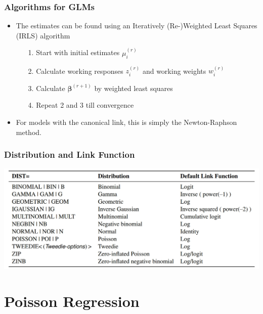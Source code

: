 \documentclass[10pt,xcolor={svgnames},t]{beamer}
\begin{document}
\begin{frame}
	\frametitle{Algorithms for GLMs}
	
	\begin{itemize}
		\item The estimates can be found using an Iteratively (Re-)Weighted Least Squares (IRLS) algorithm
		\begin{enumerate}
			\item[1.] Start with initial estimates $\mu_i^{(r)}$
			\item[2.] Calculate working responses $z_i^{(r)}$ and working weights $w_i^{(r)}$
			\item[3.] Calculate $\mathbf{\beta}^{(r+1)}$ by weighted least squares
			\item[4.] Repeat 2 and 3 till convergence
		\end{enumerate}
		\bigskip
		\item For models with the canonical link, this is simply the Newton-Raphson method.
	\end{itemize}
	
	
\end{frame}

\begin{frame}
	\frametitle{Distribution and Link Function}
	

		\begin{center}
			\includegraphics[width=1\textwidth]{link.jpg}
		\end{center}

	
	
\end{frame}
%

\section{Poisson Regression}
\end{document}
